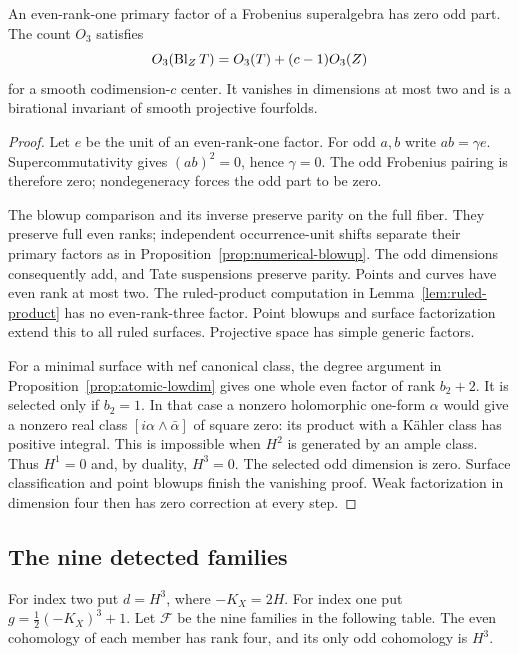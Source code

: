 \begin{lemma}
\label{lem:odd-selector}%
An even-rank-one primary factor of a Frobenius superalgebra has zero odd
part. The count $O_3$ satisfies
\[
 O_3(\operatorname{Bl}_ZT)=O_3(T)+(c-1)O_3(Z)
\]
for a smooth codimension-$c$ center. It vanishes in dimensions at most two
and is a birational invariant of smooth projective fourfolds.
\end{lemma}
\begin{proof}
Let $e$ be the unit of an even-rank-one factor. For odd $a,b$ write
$ab=\gamma e$. Supercommutativity gives $(ab)^2=0$, hence $\gamma=0$.
The odd Frobenius pairing is therefore zero; nondegeneracy forces the odd
part to be zero.

The blowup comparison and its inverse preserve parity on the full fiber.
They preserve full even ranks; independent occurrence-unit shifts separate
their primary factors as in Proposition~\ref{prop:numerical-blowup}.
The odd dimensions consequently add, and Tate suspensions preserve parity.
Points and curves have even rank at most two. The ruled-product computation
in Lemma~\ref{lem:ruled-product} has no even-rank-three factor.
Point blowups and surface factorization extend this to all ruled surfaces.
Projective space has simple generic factors.

For a minimal surface with nef canonical class, the degree argument in
Proposition~\ref{prop:atomic-lowdim} gives one whole even factor of rank
$b_2+2$. It is selected only if $b_2=1$. In that case a nonzero holomorphic
one-form $\alpha$ would give a nonzero real class
$[i\alpha\wedge\bar\alpha]$ of square zero: its product with a K\"ahler
class has positive integral. This is impossible when $H^2$ is generated
by an ample class. Thus $H^1=0$ and, by duality, $H^3=0$.
The selected odd dimension is zero. Surface classification and point
blowups finish the vanishing proof. Weak factorization in dimension four
then has zero correction at every step.
%
%
\end{proof}

\subsection{The nine detected families}
For index two put $d=H^3$, where $-K_X=2H$. For index one put
$g=\tfrac12(-K_X)^3+1$. Let $\mathcal F$ be the nine families in the
following table. The even cohomology of each member has rank four, and
its only odd cohomology is $H^3$.

